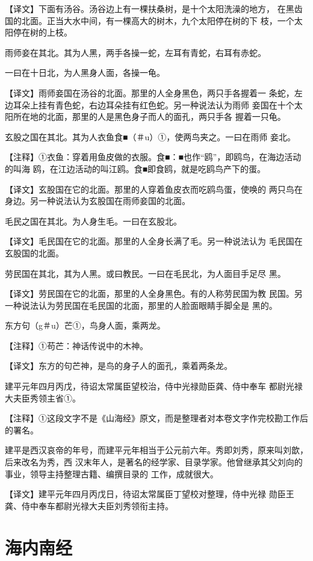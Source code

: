 \documentclass[a4paper,12pt,UTF8,twoside]{ctexbook}
\begin{document}
【译文】下面有汤谷。汤谷边上有一棵扶桑树，是十个太阳洗澡的地方， 在黑齿国的北面。正当大水中间，有一棵高大的树木，九个太阳停在树的下 枝，一个太阳停在树的上枝。

雨师妾在其北。其为人黑，两手各操一蛇，左耳有青蛇，右耳有赤蛇。

一曰在十日北，为人黑身人面，各操一龟。

【译文】雨师妾国在汤谷的北面。那里的人全身黑色，两只手各握着一 条蛇，左边耳朵上挂有青色蛇，右边耳朵挂有红色蛇。另一种说法认为雨师 妾国在十个太阳所在地的北面，那里的人是黑色身子而人的面孔，两只手各 握着一只龟。

玄股之国在其北。其为人衣鱼食■（＃u）①，使两鸟夹之。一曰在雨师 妾北。

【注释】①衣鱼：穿着用鱼皮做的衣服。食■：■也作“鸥”，即鸥鸟，在海边活动的叫海 鸥，在江边活动的叫江鸥。食■即食鸥，就是吃鸥鸟产下的蛋。

【译文】玄股国在它的北面。那里的人穿着鱼皮衣而吃鸥鸟蛋，使唤的 两只鸟在身边。另一种说法认为玄股国在雨师妾国的北面。

毛民之国在其北。为人身生毛。一曰在玄股北。

【译文】毛民国在它的北面。那里的人全身长满了毛。另一种说法认为 毛民国在玄股国的北面。

劳民国在其北，其为人黑。或曰教民。一曰在毛民北，为人面目手足尽 黑。

【译文】劳民国在它的北面，那里的人全身黑色。有的人称劳民国为教 民国。另一种说法认为劳民国在毛民国的北面，那里的人脸面眼睛手脚全是 黑的。

东方句（g＃u）芒①，鸟身人面，乘两龙。

【注释】①苟芒：神话传说中的木神。

【译文】东方的句芒神，是鸟的身子人的面孔，乘着两条龙。

建平元年四月丙戊，待诏太常属臣望校治，侍中光禄勋臣龚、侍中奉车 都尉光禄大夫臣秀领主省①。

【注释】①这段文字不是《山海经》原文，而是整理者对本卷文字作完校勘工作后的署名。

建平是西汉哀帝的年号，而建平元年相当于公元前六年。秀即刘秀，原来叫刘歆，后来改名为秀，西 汉末年人，是著名的经学家、目录学家。他曾继承其父刘向的事业，领导主持整理古籍、编撰目录的 工作，成就很大。

【译文】建平元年四月丙戊日，待诏太常属臣丁望校对整理，侍中光禄 勋臣王龚、侍中奉车都尉光禄大夫臣刘秀领衔主持。

\chapter{海内南经}
\end{document}
